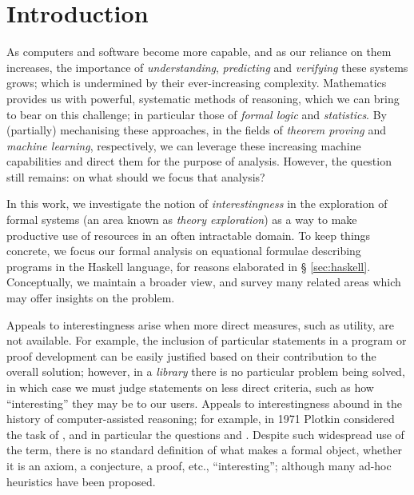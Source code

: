 \chapter{Introduction}

As computers and software become more capable, and as our reliance on them
increases, the importance of \emph{understanding}, \emph{predicting} and
\emph{verifying} these systems grows; which is undermined by their
ever-increasing complexity. Mathematics provides us with powerful, systematic
methods of reasoning, which we can bring to bear on this challenge; in
particular those of \emph{formal logic} and \emph{statistics}. By (partially)
mechanising these approaches, in the fields of \emph{theorem proving} and
\emph{machine learning}, respectively, we can leverage these increasing machine
capabilities and direct them for the purpose of analysis. However, the question
still remains: on what should we focus that analysis?

In this work, we investigate the notion of \emph{interestingness} in the
exploration of formal systems (an area known as \emph{theory exploration}) as a
way to make productive use of resources in an often intractable domain. To keep
things concrete, we focus our formal analysis on equational formulae describing
programs in the Haskell language, for reasons elaborated in \S
\ref{sec:haskell}. Conceptually, we maintain a broader view, and survey many
related areas which may offer insights on the problem.

Appeals to interestingness arise when more direct measures, such as utility, are
not available. For example, the inclusion of particular statements in a program
or proof development can be easily justified based on their contribution to the
overall solution; however, in a \emph{library} there is no particular problem
being solved, in which case we must judge statements on less direct criteria,
such as how ``interesting'' they may be to our users. Appeals to interestingness
abound in the history of computer-assisted reasoning; for example, in 1971
Plotkin \cite{plotkin1971further} considered the task of , and in particular the questions
 and . Despite such widespread use of the term, there is no
standard definition of what makes a formal object, whether it is an axiom, a
conjecture, a proof, etc., ``interesting''; although many ad-hoc heuristics have
been proposed.

